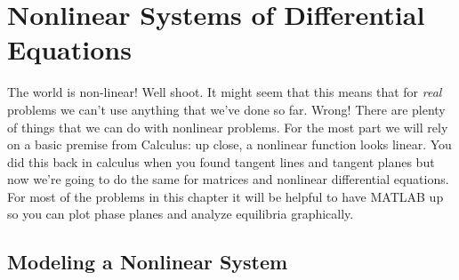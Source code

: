 \chapter{Nonlinear Systems of Differential Equations}
The world is non-linear!  Well shoot. It might seem that this means that for {\it real}
problems we can't use anything that we've done so far.   Wrong!  There are plenty of
things that we can do with nonlinear problems.  For the most part we will rely on a basic
premise from Calculus: up close, a nonlinear function looks linear. You did this back in
calculus when you found tangent lines and tangent planes but now we're going to do the
same for matrices and nonlinear differential equations.  For most of the problems in this
chapter it will be helpful to have MATLAB up so you can plot phase planes and analyze
equilibria graphically.

\section{Modeling a Nonlinear System}

